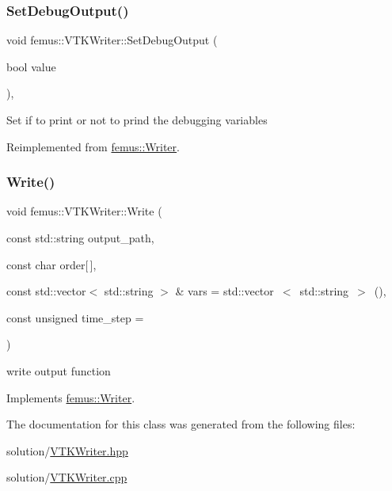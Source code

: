 \subsubsection{\texorpdfstring{Set\+Debug\+Output()}{SetDebugOutput()}}
{\footnotesize\ttfamily void femus\+::\+V\+T\+K\+Writer\+::\+Set\+Debug\+Output (\begin{DoxyParamCaption}\item[{bool}]{value }\end{DoxyParamCaption})\hspace{0.3cm}{\ttfamily [inline]}, {\ttfamily [virtual]}}

Set if to print or not to prind the debugging variables 

Reimplemented from \mbox{\hyperlink{classfemus_1_1_writer_a17a6789b58e05989d74698904346f699}{femus\+::\+Writer}}.

\mbox{\label{classfemus_1_1_v_t_k_writer_a91486b781799b8721f4a3a4099392be5}} 
\subsubsection{\texorpdfstring{Write()}{Write()}}
{\footnotesize\ttfamily void femus\+::\+V\+T\+K\+Writer\+::\+Write (\begin{DoxyParamCaption}\item[{const std\+::string}]{output\+\_\+path,  }\item[{const char}]{order\mbox{[}$\,$\mbox{]},  }\item[{const std\+::vector$<$ std\+::string $>$ \&}]{vars = {\ttfamily std\+:\+:vector~$<$~std\+:\+:string~$>$~()},  }\item[{const unsigned}]{time\+\_\+step = {} }\end{DoxyParamCaption})\hspace{0.3cm}{\ttfamily [virtual]}}

write output function 

Implements \mbox{\hyperlink{classfemus_1_1_writer_aa0f7400e0546946f317cc361397d97bd}{femus\+::\+Writer}}.



The documentation for this class was generated from the following files\+:\begin{DoxyCompactItemize}
\item 
solution/\mbox{\hyperlink{_v_t_k_writer_8hpp}{V\+T\+K\+Writer.\+hpp}}\item 
solution/\mbox{\hyperlink{_v_t_k_writer_8cpp}{V\+T\+K\+Writer.\+cpp}}\end{DoxyCompactItemize}
